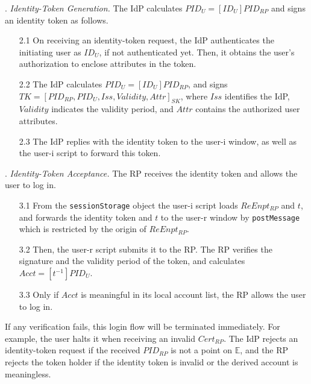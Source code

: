 . {\em Identity-Token Generation.}
The IdP calculates $PID_U = [ID_U]{PID_{RP}}$ and signs an identity token as follows. %
\begin{itemize}
\setlength{\topsep}{0pt}
\setlength{\partopsep}{0pt}
\setlength{\itemsep}{0pt}
\setlength{\parsep}{0pt}
\setlength{\parskip}{0pt}
\item[2.1]
On receiving an identity-token request,
the IdP authenticates the initiating user as $ID_U$, if not authenticated yet.
Then, it obtains the user's authorization to enclose attributes in the token.
\item[2.2]
The IdP calculates $PID_U = [ID_U]{PID_{RP}}$, and signs $TK = [PID_{RP}, PID_U, Iss, Validity, Attr]_{SK}$,
where $Iss$ identifies the IdP, $Validity$ indicates the validity period, and $Attr$ contains the authorized user attributes.
\item[2.3] The IdP replies with the identity token to the user-i window,
    as well as the user-i script to forward this token.
\end{itemize}


. {\em Identity-Token Acceptance.}
The RP receives the identity token and allows the user to log in.
\begin{itemize}
\setlength{\topsep}{0pt}
\setlength{\partopsep}{0pt}
\setlength{\itemsep}{0pt}
\setlength{\parsep}{0pt}
\setlength{\parskip}{0pt}
\item [3.1]
From the \verb+sessionStorage+ object
the user-i script loads $ReEnpt_{RP}$ and $t$, 
    and forwards the identity token and $t$ to the user-r window by \verb+postMessage+ which is restricted by the origin of $ReEnpt_{RP}$.
\item[3.2] Then, the user-r script submits it to the RP.
The RP verifies the signature and the validity period of the token, 
and calculates $Acct = [t^{-1}]{PID_U}$.

\item[3.3] Only if $Acct$ is meaningful in its local account list, the RP allows the user to log in.

\end{itemize}

If any verification fails, this login flow will be terminated immediately.
For example, the user halts it when receiving an invalid $Cert_{RP}$.
The IdP rejects an identity-token request if the received $PID_{RP}$ is not a point on $\mathbb{E}$, and the RP rejects the token holder if the identity token is invalid or the derived account is meaningless. 


